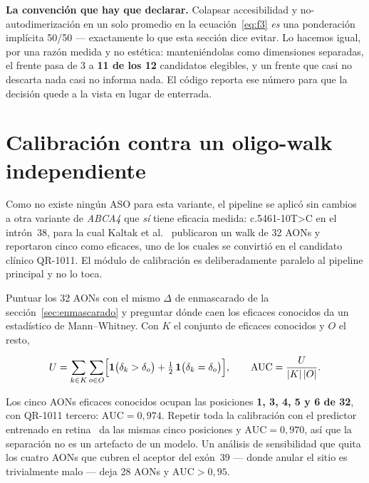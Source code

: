 \documentclass[11pt,a4paper]{article}
\begin{document}
\textbf{La convención que hay que declarar.} Colapsar accesibilidad y no-autodimerización en un solo
promedio en la ecuación~\ref{eq:f3} \emph{es} una ponderación implícita 50/50 --- exactamente lo que
esta sección dice evitar. Lo hacemos igual, por una razón medida y no estética: manteniéndolas como
dimensiones separadas, el frente pasa de 3 a \textbf{11 de los 12} candidatos elegibles, y un frente
que casi no descarta nada casi no informa nada. El código reporta ese número para que la decisión
quede a la vista en lugar de enterrada.

\section{Calibración contra un oligo-walk independiente}
\label{sec:calibracion}

Como no existe ningún ASO para esta variante, el pipeline se aplicó sin cambios a otra variante de
\emph{ABCA4} que \emph{sí} tiene eficacia medida: c.5461-10T>C en el intrón~38, para la cual Kaltak
et al.~\cite{kaltak2023} publicaron un walk de 32 AONs y reportaron cinco como eficaces, uno de los
cuales se convirtió en el candidato clínico QR-1011. El módulo de calibración es deliberadamente
paralelo al pipeline principal y no lo toca.

Puntuar los 32 AONs con el mismo $\Delta$ de enmascarado de la sección~\ref{sec:enmascarado} y
preguntar dónde caen los eficaces conocidos da un estadístico de Mann--Whitney. Con $K$ el conjunto
de eficaces conocidos y $O$ el resto,

\begin{equation}
U = \sum_{k \in K} \sum_{o \in O}
\Bigl[\mathbf{1}\bigl(\delta_k > \delta_o\bigr) + \tfrac{1}{2}\,\mathbf{1}\bigl(\delta_k = \delta_o\bigr)\Bigr],
\qquad
\mathrm{AUC} = \frac{U}{|K|\,|O|}.
\label{eq:auc}
\end{equation}

Los cinco AONs eficaces conocidos ocupan las posiciones \textbf{1, 3, 4, 5 y 6 de 32}, con QR-1011
tercero: $\mathrm{AUC} = 0{,}974$. Repetir toda la calibración con el predictor entrenado en
retina~\cite{riepe2025} da las mismas cinco posiciones y $\mathrm{AUC} = 0{,}970$, así que la
separación no es un artefacto de un modelo. Un análisis de sensibilidad que quita los cuatro AONs que
cubren el aceptor del exón~39 --- donde anular el sitio es trivialmente malo --- deja 28 AONs y
$\mathrm{AUC} > 0{,}95$.
\end{document}
